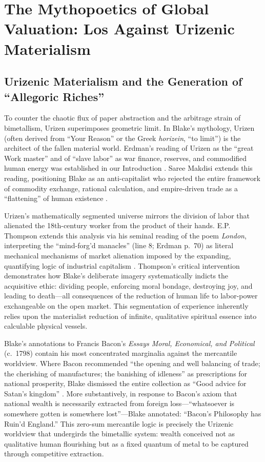\documentclass[
]{article}
\begin{document}
\section{The Mythopoetics of Global Valuation: Los Against Urizenic
Materialism}\label{the-mythopoetics-of-global-valuation-los-against-urizenic-materialism}

\subsection{Urizenic Materialism and the Generation of ``Allegoric
Riches''}\label{sec-urizenic-materialism}

To counter the chaotic flux of paper abstraction and the arbitrage
strain of bimetallism, Urizen superimposes geometric limit. In Blake's
mythology, Urizen (often derived from ``Your Reason'' or the Greek
\emph{horizein}, ``to limit'') is the architect of the fallen material
world. Erdman's reading of Urizen as the ``great Work master'' and of
``slave labor'' as war finance, reserves, and commodified human energy
was established in our Introduction \citep{erdman1954prophet}. Saree
Makdisi extends this reading, positioning Blake as an anti-capitalist
who rejected the entire framework of commodity exchange, rational
calculation, and empire-driven trade as a ``flattening'' of human
existence \citep{makdisi2003william}.

Urizen's mathematically segmented universe mirrors the division of labor
that alienated the 18th-century worker from the product of their hands.
E.P. Thompson extends this analysis via his seminal reading of the poem
\emph{London}, interpreting the ``mind-forg'd manacles'' (line 8; Erdman
p.~70) as literal mechanical mechanisms of market alienation imposed by
the expanding, quantifying logic of industrial capitalism
\citep{thompson1993witness}. Thompson's critical intervention
demonstrates how Blake's deliberate imagery systematically indicts the
acquisitive ethic: dividing people, enforcing moral bondage, destroying
joy, and leading to death---all consequences of the reduction of human
life to labor-power exchangeable on the open market. This segmentation
of experience inherently relies upon the materialist reduction of
infinite, qualitative spiritual essence into calculable physical
vessels.

Blake's annotations to Francis Bacon's \emph{Essays Moral, Economical,
and Political} (c.~1798) contain his most concentrated marginalia
against the mercantile worldview. Where Bacon recommended ``the opening
and well balancing of trade; the cherishing of manufactures; the
banishing of idleness'' as prescriptions for national prosperity, Blake
dismissed the entire collection as ``Good advice for Satan's kingdom''
\citep{erdman1988complete}. More substantively, in response to Bacon's
axiom that national wealth is necessarily extracted from foreign
loss---``whatsoever is somewhere gotten is somewhere lost''---Blake
annotated: ``Bacon's Philosophy has Ruin'd England.'' This zero-sum
mercantile logic is precisely the Urizenic worldview that undergirds the
bimetallic system: wealth conceived not as qualitative human flourishing
but as a fixed quantum of metal to be captured through competitive
extraction.
\end{document}
